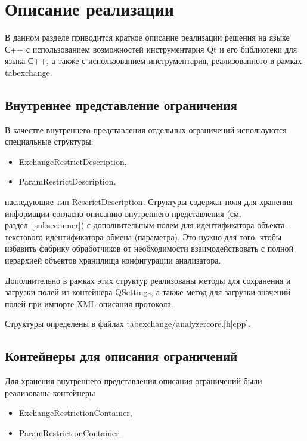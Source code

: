 \section{Описание реализации}

В данном разделе приводится краткое описание реализации решения на языке С++ с 
использованием возможностей инструментария Qt и его библиотеки для языка С++, а 
также с использованием инструментария, реализованного в рамках tabexchange.

\subsection*{Внутреннее представление ограничения}

В качестве внутреннего представления отдельных ограничений используются 
специальные структуры: 

\begin{itemize}
 \item ExchangeRestrictDescription,
 \item ParamRestrictDescription,
\end{itemize}

наследующие тип RescrictDescription. Структуры содержат поля для хранения 
информации согласно описанию внутреннего представления (см. 
раздел~\ref{subsec:inner}) с дополнительным полем для идентификатора объекта - 
текстового идентификатора обмена (параметра). Это нужно для того, чтобы 
избавить фабрику обработчиков от необходимости взаимодействовать с полной 
иерархией объектов хранилища конфигурации анализатора.

Дополнительно в рамках этих структур реализованы методы для сохранения и 
загрузки полей из контейнера QSettings, а также метод для загрузки 
значений полей при импорте XML-описания протокола.

Структуры определены в файлах tabexchange/analyzercore.[h|cpp].

\subsection*{Контейнеры для описания ограничений}

Для хранения внутреннего представления описания ограничений были реализованы 
контейнеры
\begin{itemize}
 \item ExchangeRestrictionContainer,
 \item ParamRestrictionContainer.
\end{itemize}

